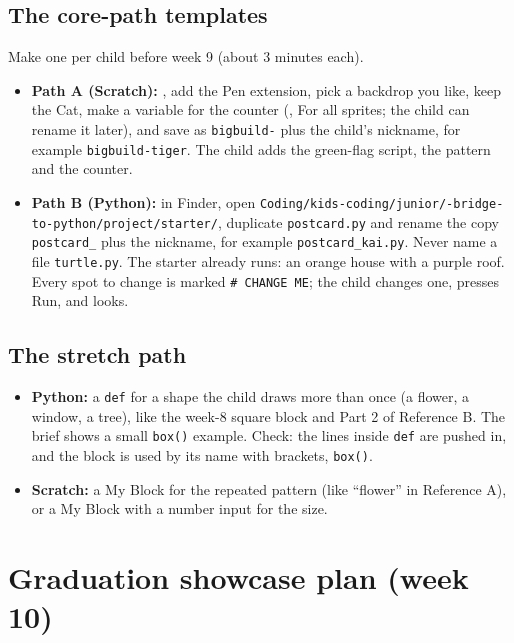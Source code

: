 \documentclass[track=junior,level=3,teacher]{kidscode}
\begin{document}
\subsection{The core-path templates}
Make one per child before week 9 (about 3 minutes each).
\begin{itemize}[itemsep=2pt]
  \item \textbf{Path A (Scratch):} , add the Pen extension, pick a backdrop you like, keep
        the Cat, make a variable for the counter (, For all sprites; the child can
        rename it later), and save as \texttt{bigbuild-} plus the child's nickname, for example
        \texttt{bigbuild-tiger}. The child adds the green-flag script, the pattern and the counter.
  \item \textbf{Path B (Python):} in Finder, open
        \texttt{Coding/\allowbreak kids-coding/\allowbreak junior/-bridge-to-python/\allowbreak project/\allowbreak starter/},
        duplicate \texttt{postcard.py} and rename the copy \texttt{postcard\_} plus the nickname, for example
        \texttt{postcard\_kai.py}. Never name a file \texttt{turtle.py}. The starter already runs: an orange
        house with a purple roof. Every spot to change is marked \texttt{\# CHANGE ME}; the child changes one,
        presses Run, and looks.
\end{itemize}

\subsection{The stretch path}
\begin{itemize}[itemsep=2pt]
  \item \textbf{Python:} a \texttt{def} for a shape the child draws more than once (a flower, a window, a
        tree), like the week-8 square block and Part 2 of Reference B. The brief shows a small \texttt{box()}
        example. Check: the lines inside \texttt{def} are pushed in, and the block is used by its name with
        brackets, \texttt{box()}.
  \item \textbf{Scratch:} a My Block for the repeated pattern (like \enquote{flower} in Reference A), or a My
        Block with a number input for the size.
\end{itemize}

\section{Graduation showcase plan (week 10)}
\end{document}
